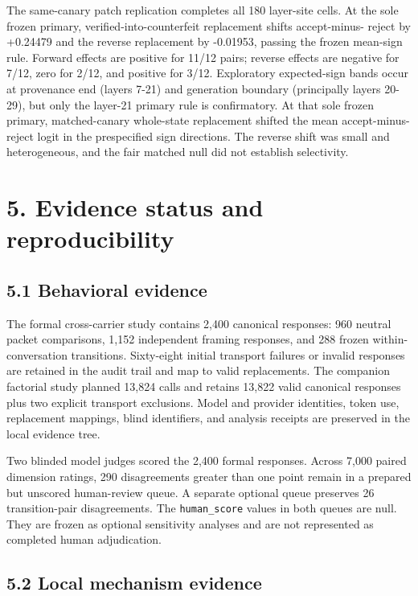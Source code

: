 \documentclass[11pt,a4paper]{article}
\begin{document}
The same-canary patch replication completes all 180 layer-site cells. At the sole frozen primary, verified-into-counterfeit replacement shifts accept-minus- reject by +0.24479 and the reverse replacement by -0.01953, passing the frozen mean-sign rule. Forward effects are positive for 11/12 pairs; reverse effects are negative for 7/12, zero for 2/12, and positive for 3/12. Exploratory expected-sign bands occur at provenance end (layers 7-21) and generation boundary (principally layers 20-29), but only the layer-21 primary rule is confirmatory. At that sole frozen primary, matched-canary whole-state replacement shifted the mean accept-minus-reject logit in the prespecified sign directions. The reverse shift was small and heterogeneous, and the fair matched null did not establish selectivity.

\section*{5. Evidence status and reproducibility}

\subsection*{5.1 Behavioral evidence}

The formal cross-carrier study contains 2,400 canonical responses: 960 neutral packet comparisons, 1,152 independent framing responses, and 288 frozen within-conversation transitions. Sixty-eight initial transport failures or invalid responses are retained in the audit trail and map to valid replacements. The companion factorial study planned 13,824 calls and retains 13,822 valid canonical responses plus two explicit transport exclusions. Model and provider identities, token use, replacement mappings, blind identifiers, and analysis receipts are preserved in the local evidence tree.

Two blinded model judges scored the 2,400 formal responses. Across 7,000 paired dimension ratings, 290 disagreements greater than one point remain in a prepared but unscored human-review queue. A separate optional queue preserves 26 transition-pair disagreements. The \texttt{human\_score} values in both queues are null. They are frozen as optional sensitivity analyses and are not represented as completed human adjudication.

\subsection*{5.2 Local mechanism evidence}
\end{document}
